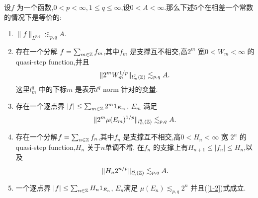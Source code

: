 \begin{theorem}[Characterisation of $L^{p,q}$]\label{thm1-1}
  设$f$ 为一个函数,$0<p<\infty,1\le q\le \infty$,设$0<A<\infty$.那么下述5个在相差一个常数的情况下是等价的:
  \begin{enumerate}
    \item  $\|f\|_{L^{p,q}}\lesssim_{p,q}A$.
    \item  存在一个分解 $f=\sum_{m\in \mathbb{Z}}^{} f_m$,其中$f_m$ 是支撑互不相交,高$2^{m}$ 宽$0<W_m<\infty$ 的 quasi-step function,并且
      \begin{equation}
	\|2^{m}W^{1 /p}_m\|_{l^{q}_m(\mathbb{Z})}\lesssim_{p,q}A.
      \end{equation}
      这里$l^{q}_m$ 中的下标$m$ 是表示$l^{q}$ norm 针对的变量.
    \item 存在一个逐点界 $|f|\le \sum_{m\in \mathbb{Z}}^{} 2^{m} 1_{E_m}$, $E_m$ 满足
      \begin{equation}
	\|2^{m}\mu(E_m)^{1 /p}\|_{l^{q}_m(\mathbb{Z})}\lesssim_{p,q}A.
      \end{equation}
    \item 存在一个分解$f=\sum_{n \in \mathbb{Z}}^{} f_{n}$,其中$f_n$ 是支撑互不相交,高$0<H_n<\infty$ 宽 $2^{n}$ 的 quasi-step function,$H_n$ 关于$n$单调不增, 在$f_n$ 的支撑上有$H_{n+1}\le |f_n|\le H_n$,以及
      \begin{equation}\label{1-2}
	\|H_n 2^{n /p}\|_{l^{q}_n(\mathbb{Z})}\lesssim_{p,q}A.
      \end{equation}
  \item 一个逐点界 $|f|\le \sum_{n\in \mathbb{Z}}^{} H_n 1_{E_n}$, $E_n$满足 $\mu(E_n)\lesssim_{p,q}2^{n}$ 并且{\normalfont (\ref{1-2})}式成立.
  \end{enumerate}
\end{theorem}
